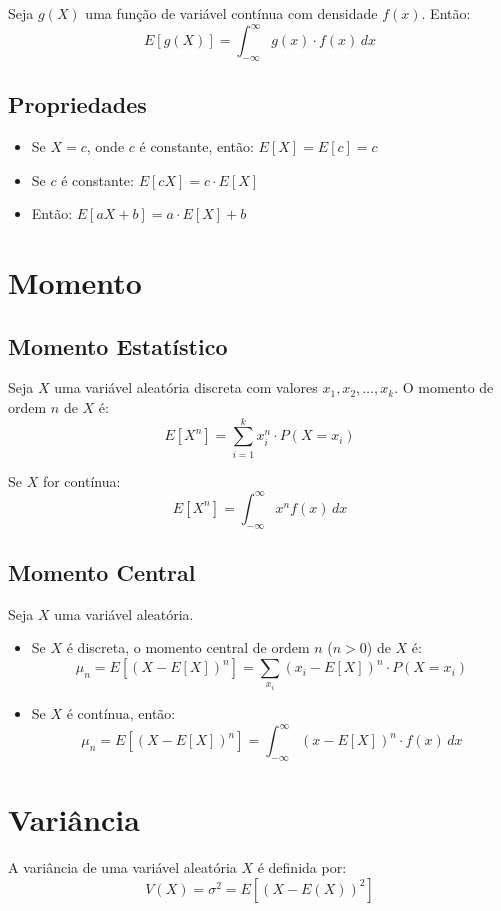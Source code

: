 \documentclass{article}
\begin{document}
Seja $g(X)$ uma função de variável contínua com densidade $f(x)$. Então:
    $$
    E[g(X)] = \int_{-\infty}^{\infty} g(x) \cdot f(x) \, dx
    $$

\subsection{Propriedades}
\begin{itemize}
    \item Se $X = c$, onde $c$ é constante, então: $E[X] = E[c] = c$
    \item Se $c$ é constante: $E[cX] = c \cdot E[X]$
    \item Então: $E[aX + b] = a \cdot E[X] + b$
\end{itemize}

\section{Momento}
\subsection{Momento Estatístico}
Seja $X$ uma variável aleatória discreta com valores $x_1, x_2, \dots, x_k$. O momento de ordem $n$ de $X$ é:
    $$
    E[X^n] = \sum_{i=1}^{k} x_i^n \cdot P(X = x_i)
    $$

Se $X$ for contínua:
    $$
    E[X^n] = \int_{-\infty}^{\infty} x^n f(x) \, dx
    $$

\subsection{Momento Central}
Seja $X$ uma variável aleatória.

\begin{itemize}
    \item Se $X$ é discreta, o momento central de ordem $n$ ($n > 0$) de $X$ é:
    $$
    \mu_n = E\left[(X - E[X])^n\right] = \sum_{x_i} (x_i - E[X])^n \cdot P(X = x_i)
    $$
    \item Se $X$ é contínua, então:
    $$
    \mu_n = E\left[(X - E[X])^n\right] = \int_{-\infty}^{\infty} (x - E[X])^n \cdot f(x) \, dx
    $$
\end{itemize}

\section{Variância}
A variância de uma variável aleatória $X$ é definida por:
    $$
    V(X) = \sigma^2 = E\left[(X - E(X))^2\right]
    $$
\end{document}
